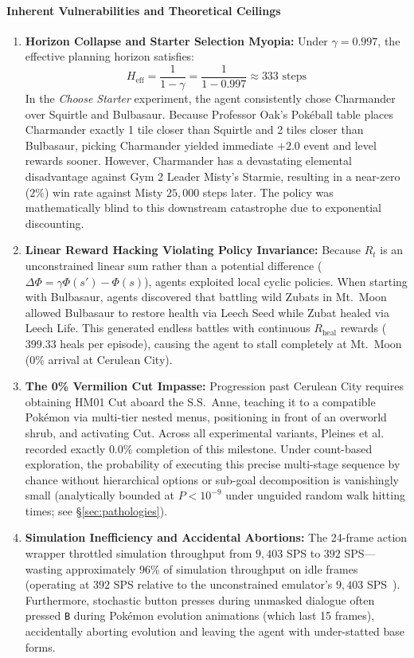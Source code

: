 \documentclass[journal,10pt,twocolumn]{IEEEtran}
\begin{document}
\paragraph{Inherent Vulnerabilities and Theoretical Ceilings}
\begin{enumerate}
    \item \textbf{Horizon Collapse and Starter Selection Myopia:} Under $\gamma = 0.997$, the effective planning horizon satisfies:
    \begin{equation}
    H_{\text{eff}} = \frac{1}{1 - \gamma} = \frac{1}{1 - 0.997} \approx 333 \text{ steps}
    \end{equation}
    In the \textit{Choose Starter} experiment, the agent consistently chose Charmander over Squirtle and Bulbasaur. Because Professor Oak's Pok{\'e}ball table places Charmander exactly 1 tile closer than Squirtle and 2 tiles closer than Bulbasaur, picking Charmander yielded immediate $+2.0$ event and level rewards sooner. However, Charmander has a devastating elemental disadvantage against Gym 2 Leader Misty's Starmie, resulting in a near-zero ($2\%$) win rate against Misty $25{,}000$ steps later. The policy was mathematically blind to this downstream catastrophe due to exponential discounting.
    \item \textbf{Linear Reward Hacking Violating Policy Invariance:} Because $R_t$ is an unconstrained linear sum rather than a potential difference ($\Delta \Phi = \gamma \Phi(s') - \Phi(s)$), agents exploited local cyclic policies. When starting with Bulbasaur, agents discovered that battling wild Zubats in Mt.~Moon allowed Bulbasaur to restore health via Leech Seed while Zubat healed via Leech Life. This generated endless battles with continuous $R_{\text{heal}}$ rewards ($399.33$ heals per episode), causing the agent to stall completely at Mt.~Moon ($0\%$ arrival at Cerulean City).
    \item \textbf{The 0\% Vermilion Cut Impasse:} Progression past Cerulean City requires obtaining HM01 Cut aboard the S.S.~Anne, teaching it to a compatible Pok{\'e}mon via multi-tier nested menus, positioning in front of an overworld shrub, and activating Cut. Across all experimental variants, Pleines et al. recorded exactly $0.0\%$ completion of this milestone. Under count-based exploration, the probability of executing this precise multi-stage sequence by chance without hierarchical options or sub-goal decomposition is vanishingly small (analytically bounded at $P < 10^{-9}$ under unguided random walk hitting times; see \S\ref{sec:pathologies}).
    \item \textbf{Simulation Inefficiency and Accidental Abortions:} The 24-frame action wrapper throttled simulation throughput from $9{,}403$ SPS to $392$ SPS---wasting approximately $96\%$ of simulation throughput on idle frames (operating at $392$ SPS relative to the unconstrained emulator's $9{,}403$ SPS~\cite{pleines2025pokemon}). Furthermore, stochastic button presses during unmasked dialogue often pressed \texttt{B} during Pok{\'e}mon evolution animations (which last 15 frames), accidentally aborting evolution and leaving the agent with under-statted base forms.

\end{enumerate}
\end{document}
